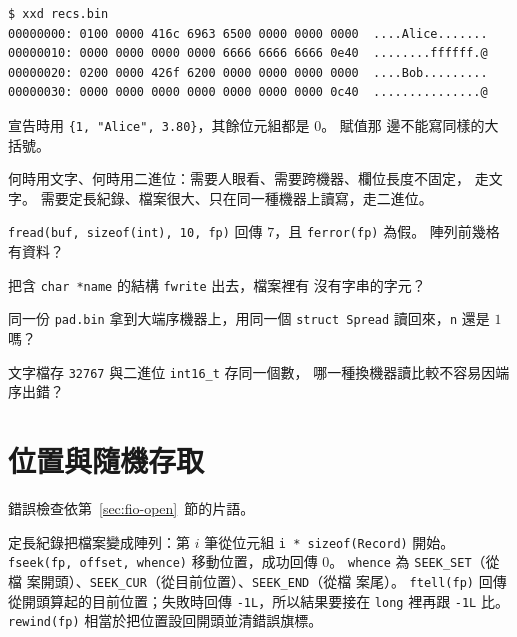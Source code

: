 
\begin{center}
\begin{verbatim}
$ xxd recs.bin
00000000: 0100 0000 416c 6963 6500 0000 0000 0000  ....Alice.......
00000010: 0000 0000 0000 0000 6666 6666 6666 0e40  ........ffffff.@
00000020: 0200 0000 426f 6200 0000 0000 0000 0000  ....Bob.........
00000030: 0000 0000 0000 0000 0000 0000 0000 0c40  ...............@
\end{verbatim}
\end{center}

宣告時用 \texttt{\{1, "Alice", 3.80\}}，其餘位元組都是 $0$。 賦值那
邊不能寫同樣的大括號。

何時用文字、何時用二進位：需要人眼看、需要跨機器、欄位長度不固定，
走文字。 需要定長紀錄、檔案很大、只在同一種機器上讀寫，走二進位。


\begin{drills}[label=drills:fio-bin]
\item \texttt{fread(buf, sizeof(int), 10, fp)} 回傳 $7$，且
\texttt{ferror(fp)} 為假。 陣列前幾格有資料？
\item 把含 \texttt{char *name} 的結構 \texttt{fwrite} 出去，檔案裡有
沒有字串的字元？
\item 同一份 \texttt{pad.bin} 拿到大端序機器上，用同一個
\texttt{struct Spread} 讀回來，\texttt{n} 還是 $1$ 嗎？
\item 文字檔存 \texttt{32767} 與二進位 \texttt{int16\_t} 存同一個數，
哪一種換機器讀比較不容易因端序出錯？
\end{drills}

\section{位置與隨機存取}
\label{sec:fio-seek}

錯誤檢查依第~\ref{sec:fio-open}~節的片語。

定長紀錄把檔案變成陣列：第 $i$ 筆從位元組
\texttt{i * sizeof(Record)} 開始。 \texttt{fseek(fp, offset, whence)}
移動位置，成功回傳 $0$。 \texttt{whence} 為 \texttt{SEEK\_SET}（從檔
案開頭）、\texttt{SEEK\_CUR}（從目前位置）、\texttt{SEEK\_END}（從檔
案尾）。 \texttt{ftell(fp)} 回傳從開頭算起的目前位置；失敗時回傳
\texttt{-1L}，所以結果要接在 \texttt{long} 裡再跟 \texttt{-1L} 比。
\texttt{rewind(fp)} 相當於把位置設回開頭並清錯誤旗標。

